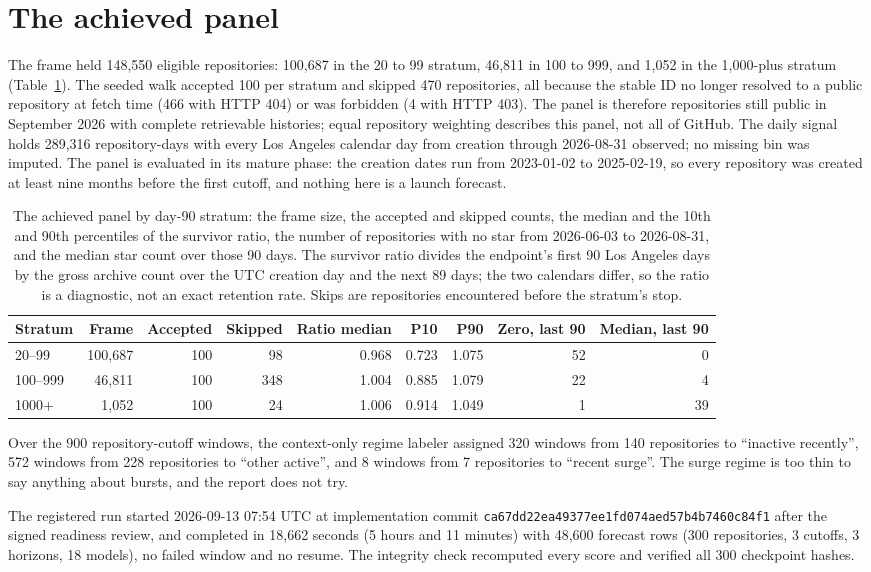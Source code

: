 \section{The achieved panel}

The frame held 148,550 eligible repositories: 100,687 in the 20 to 99 stratum, 46,811 in 100 to 999, and
1,052 in the 1,000-plus stratum (Table~\ref{tab:panel}). The seeded walk accepted 100 per stratum and skipped
470 repositories, all because the stable ID no longer resolved to a public repository at fetch time (466 with
HTTP 404) or was forbidden (4 with HTTP 403). The panel is therefore repositories still public in September
2026 with complete retrievable histories; equal repository weighting describes this panel, not all of GitHub.
The daily signal holds 289,316 repository-days with every Los Angeles calendar day from creation through
2026-08-31 observed; no missing bin was imputed. The panel is evaluated in its mature phase: the creation
dates run from 2023-01-02 to 2025-02-19, so every repository was created at least nine months before the
first cutoff, and nothing here is a launch forecast.

\begin{table}[t]
\centering\footnotesize
\caption{The achieved panel by day-90 stratum: the frame size, the accepted and skipped counts, the median
and the 10th and 90th percentiles of the survivor ratio, the number of repositories with no star from
2026-06-03 to 2026-08-31, and the median star count over those 90 days. The survivor ratio divides the
endpoint's first 90 Los Angeles days by the gross archive count over the UTC creation day and the next 89
days; the two calendars differ, so the ratio is a diagnostic, not an exact retention rate. Skips are
repositories encountered before the stratum's stop.}
\label{tab:panel}
\begin{tabular}{lrrrrrrrr}
\toprule
Stratum & Frame & Accepted & Skipped & Ratio median & P10 & P90 & Zero, last 90 & Median, last 90 \\
\midrule
20--99 & 100,687 & 100 & 98 & 0.968 & 0.723 & 1.075 & 52 & 0 \\
100--999 & 46,811 & 100 & 348 & 1.004 & 0.885 & 1.079 & 22 & 4 \\
1000+ & 1,052 & 100 & 24 & 1.006 & 0.914 & 1.049 & 1 & 39 \\
\bottomrule
\end{tabular}
\end{table}

Over the 900 repository-cutoff windows, the context-only regime labeler assigned 320 windows from 140
repositories to ``inactive recently'', 572 windows from 228 repositories to ``other active'', and 8 windows
from 7 repositories to ``recent surge''. The surge regime is too thin to say anything about bursts, and the
report does not try.

The registered run started 2026-09-13 07:54 UTC at implementation commit
\texttt{ca67dd22ea49377ee1fd074aed57b4b7460c84f1} after the signed readiness review, and completed in
18,662 seconds (5 hours and 11 minutes) with 48,600 forecast rows (300 repositories, 3 cutoffs, 3 horizons,
18 models), no failed window and no resume. The integrity check recomputed every score and verified all 300
checkpoint hashes.
